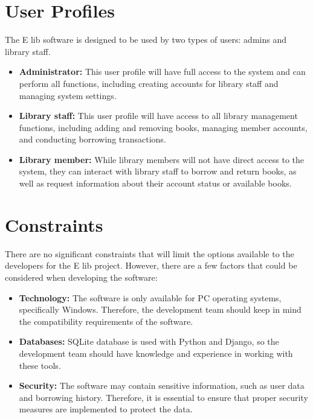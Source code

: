 \section{User Profiles}
The E lib software is designed to be used by two types of users: admins and library staff.
\begin{itemize}
    \item \textbf{Administrator: }  This user profile will have full access to the system and can perform all functions, including creating accounts for library staff and managing system settings.
    \item \textbf{Library staff: } This user profile will have access to all library management functions, including adding and removing books, managing member accounts, and conducting borrowing transactions.
    \item \textbf{Library member: }  While library members will not have direct access to the system, they can interact with library staff to borrow and return books, as well as request information about their account status or available books.

\end{itemize}

\section{Constraints}
There are no significant constraints that will limit the options available to the developers for the E lib project. However, there are a few factors that could be considered when developing the software:
 \begin{itemize}
    \item \textbf{Technology: }   The software is only available for PC operating systems, specifically Windows. Therefore, the development team should keep in mind the compatibility requirements of the software.
    \item \textbf{Databases:  }SQLite database is used with Python and Django, so the development team should have knowledge and experience in working with these tools.
    \item \textbf{Security: } The software may contain sensitive information, such as user data and borrowing history. Therefore, it is essential to ensure that proper security measures are implemented to protect the data.
 \end{itemize}
 


    
